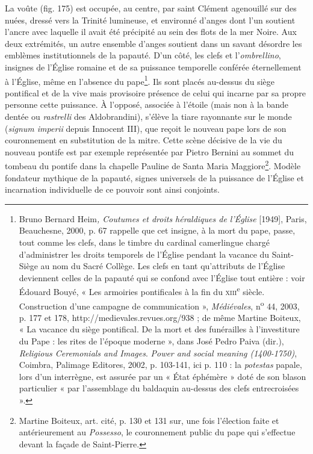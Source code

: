 \documentclass[12pt,twoside,openany]{book}
\begin{document}
La voûte (fig. 175) est occupée, au centre, par saint Clément agenouillé sur des nuées, dressé vers la Trinité lumineuse, et environné d’anges dont l’un soutient l’ancre avec laquelle il avait été précipité au sein des flots de la mer Noire. Aux deux extrémités, un autre ensemble d’anges soutient dans un savant désordre les emblèmes institutionnels de la papauté. D’un côté, les clefs et l’\textit{ombrellino}, insignes de l’Église romaine et de sa puissance temporelle conférée éternellement à l’Église, même en l’absence du pape\footnote{Bruno Bernard Heim\textit{, Coutumes et droits héraldiques de l’Église} [1949], Paris, Beauchesne, 2000, p. 67 rappelle que cet insigne, à la mort du pape, passe, tout comme les clefs, dans le timbre du cardinal camerlingue chargé d’administrer les droits temporels de l’Église pendant la vacance du Saint-Siège au nom du Sacré Collège. Les clefs en tant qu’attributs de l’Église deviennent celles de la papauté qui se confond avec l’Église tout entière : voir Édouard Bouyé, « Les armoiries pontificales à la fin du \textsc{xiii}\textsuperscript{e} siècle. Construction d’une campagne de communication », \textit{Médiévales}, n\textsuperscript{o} 44, 2003, p. 177 et 178, http://medievales.revues.org/938 ; de même Martine Boiteux, « La vacance du siège pontifical. De la mort et des funérailles à l’investiture du Pape : les rites de l’époque moderne », dans José Pedro Paiva (dir.), \textit{Religious Ceremonials and Images}. \textit{Power and social meaning (1400-1750)}, Coimbra, Palimage Editores, 2002, p. 103-141, ici p. 110 : la \textit{potestas} papale, lors d’un interrègne, est assurée par un « État éphémère » doté de son blason particulier « par l’assemblage du baldaquin au-dessus des clefs entrecroisées ».}. Ils sont placés au-dessus du siège pontifical et de la vive mais provisoire présence de celui qui incarne par sa propre personne cette puissance. À l’opposé, associée à l’étoile (mais non à la bande dentée ou \textit{rastrelli} des Aldobrandini), s’élève la tiare rayonnante sur le monde (\textit{signum imperii} depuis Innocent III), que reçoit le nouveau pape lors de son couronnement en substitution de la mitre. Cette scène décisive de la vie du nouveau pontife est par exemple représentée par Pietro Bernini au sommet du tombeau du pontife dans la chapelle Pauline de Santa Maria Maggiore\footnote{Martine Boiteux, art. cité, p. 130 et 131 sur, une fois l’élection faite et antérieurement au \textit{Possesso}, le couronnement public du pape qui s’effectue devant la façade de Saint-Pierre.}. Modèle fondateur mythique de la papauté, signes universels de la puissance de l’Église et incarnation individuelle de ce pouvoir sont ainsi conjoints.
\end{document}
